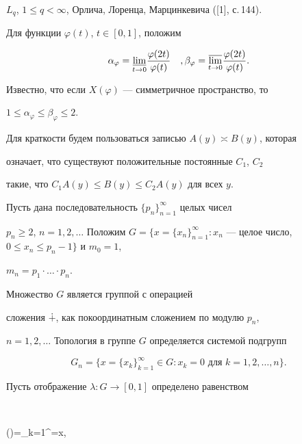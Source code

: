 $L_{q}$, $1\leq q<\infty$, Орлича, Лоренца, Марцинкевича ([1], с.\,144).





Для функции $\varphi(t)$, $t \in [0,1]$, положим


$$


\alpha_\varphi=\underset{t\to 0}{\varliminf}{}\frac{\varphi(2t)}{\varphi(t)} 


\quad, 


\beta_\varphi=\underset{t\to 0}{\varlimsup}{}\frac{\varphi(2t)}{\varphi(t)}.


$$


Известно, что если $X(\varphi)$ --- симметричное пространство, то 


$1\leq\alpha_{\varphi}\leq\beta_{\varphi}\leq 2.$ 


Для краткости будем пользоваться записью $A(y)\asymp B(y)$, которая


означает, что существуют положительные постоянные $C_{1}$, $C_{2}$ 


такие, что $C_{1}A(y) \leq B(y) \leq C_{2}A(y)$ для всех $y$.





Пусть дана последовательность $\{p_n\}_{n=1}^{\infty}$ целых чисел 


$p_n\geq2$, $n=1,2,\dotsc$ Положим $G=\big\{x=\{x_{n}\}_{n=1}^{\infty}: 


x_{n}$ --- целое число, $0\leq x_n\leq p_{n}-1\big\}$ и $m_{0}=1$, 


$m_{n}=p_{1}\cdot\dotsc\cdot p_{n}$.


Множество $G$ является группой с операцией 


сложения $\dotplus$, как покоординатным сложением по модулю $p_{n}$, 


$n=1,2,\dotsc$ Топология в группе $G$ определяется системой подгрупп


$$


G_{n}=\big\{x=\{x_{k}\}_{k=1}^{\infty}\in G:


x_{k}=0 \text{ для } k=1,2,\dotsc,n\big\}.


$$


 


Пусть отображение $\lambda:G\rightarrow[0,1]$ определено равенством


$$


\lambda()=\sum_{k=1}^{\infty}=x,


